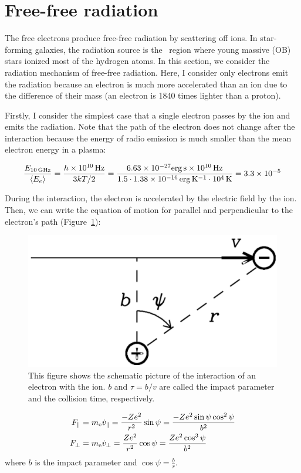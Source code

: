 \section{Free-free radiation}\label{sec:freefreeradiation}

The free electrons produce free-free radiation by scattering off ions.
In star-forming galaxies, the radiation source is the \ih~region where young massive (OB) stars ionized most of the hydrogen atoms.
In this section, we consider the radiation mechanism of free-free radiation.
Here, I consider only electrons emit the radiation because an electron is much more accelerated than an ion due to the difference of their mass (an electron is 1840 times lighter than a proton).

Firstly, I consider the simplest case that a single electron passes by the ion and emits the radiation.
Note that the path of the electron does not change after the interaction because the energy of radio emission is much smaller than the mean electron energy in a plasma:

\begin{equation}\label{eq:essential_radio4n12}
    \frac{E_{\mathrm{10\,\mathrm{GHz}}}}{\left\langle E_e\right\rangle} = \frac{h \times 10^{10}\,\mathrm{Hz}}{3kT / 2} = \frac{6.63 \times 10^{-27} \mathrm{erg\,s} \times 10^{10}\,\mathrm{Hz}}{1.5 \cdot 1.38 \times 10^{-16}\,\mathrm{erg\,K^{-1}} \cdot 10^4\,\mathrm{K}} = 3.3 \times 10^{-5}
\end{equation}

During the interaction, the electron is accelerated by the electric field by the ion.
Then, we can write the equation of motion for parallel and perpendicular to the electron's path (Figure~\ref{fig:nrao_radio4n2}):

\begin{figure}[htbp]
	\centering
	\includegraphics[width=.5\linewidth]{Chapter_2/Figures/NRAO_radio4n2.png}
    \caption[The schematic image of the interaction of an electron with the ion]{\label{fig:nrao_radio4n2}
        This figure shows the schematic picture of the interaction of an electron with the ion.
        $b$ and $\tau = b/v$ are called the impact parameter and the collision time, respectively.
    }
\end{figure}
\begin{align}
    F_{\|} &= m_{\mathrm{e}} \dot{v}_{\|}=\frac{-Z e^{2}}{r^{2}} \sin \psi=\frac{-Z e^{2} \sin \psi \cos ^{2} \psi}{b^{2}}\label{eq:essential_radio4n15}\\
    F_{\perp} &= m_{\mathrm{e}} \dot{v}_{\perp}=\frac{Z e^{2}}{r^{2}} \cos \psi=\frac{Z e^{2} \cos ^{3} \psi}{b^{2}}\label{eq:essential_radio4n16}
\end{align}
where $b$ is the impact parameter and $\cos\psi = \frac{b}{r}$.

